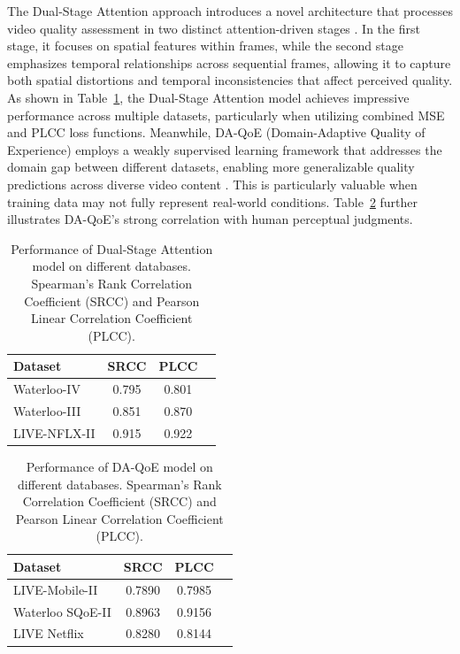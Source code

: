 The Dual-Stage Attention approach introduces a novel architecture that processes video quality assessment in two distinct attention-driven stages \cite{jia2024continuous}. In the first stage, it focuses on spatial features within frames, while the second stage emphasizes temporal relationships across sequential frames, allowing it to capture both spatial distortions and temporal inconsistencies that affect perceived quality. As shown in Table~\ref{tab:dsa_performance}, the Dual-Stage Attention model achieves impressive performance across multiple datasets, particularly when utilizing combined MSE and PLCC loss functions. Meanwhile, DA-QoE (Domain-Adaptive Quality of Experience) employs a weakly supervised learning framework that addresses the domain gap between different datasets, enabling more generalizable quality predictions across diverse video content \cite{li2022weakly}. This is particularly valuable when training data may not fully represent real-world conditions. Table~\ref{tab:da_qoe_performance} further illustrates DA-QoE's strong correlation with human perceptual judgments.

\begin{table}[ht]
\centering
\caption{Performance of Dual-Stage Attention model on different databases. Spearman's Rank Correlation Coefficient (SRCC) and Pearson Linear Correlation Coefficient (PLCC).}
\label{tab:dsa_performance}
\begin{tabular}{lccc}
\hline
\textbf{Dataset} & \textbf{SRCC} & \textbf{PLCC} \\
\hline
Waterloo-IV & 0.795 & 0.801 \\
Waterloo-III & 0.851 & 0.870 \\
LIVE-NFLX-II  & 0.915 & 0.922 \\
\hline
\end{tabular}
\end{table}

\begin{table}[ht]
\centering
\caption{Performance of DA-QoE model on different databases. Spearman's Rank Correlation Coefficient (SRCC) and Pearson Linear Correlation Coefficient (PLCC).}
\label{tab:da_qoe_performance}
\begin{tabular}{lccc}
\hline
\textbf{Dataset} & \textbf{SRCC} & \textbf{PLCC} \\
\hline
LIVE-Mobile-II & 0.7890 & 0.7985 \\
Waterloo SQoE-II & 0.8963 & 0.9156 \\
LIVE Netflix  & 0.8280 & 0.8144 \\
\hline
\end{tabular}
\end{table}

